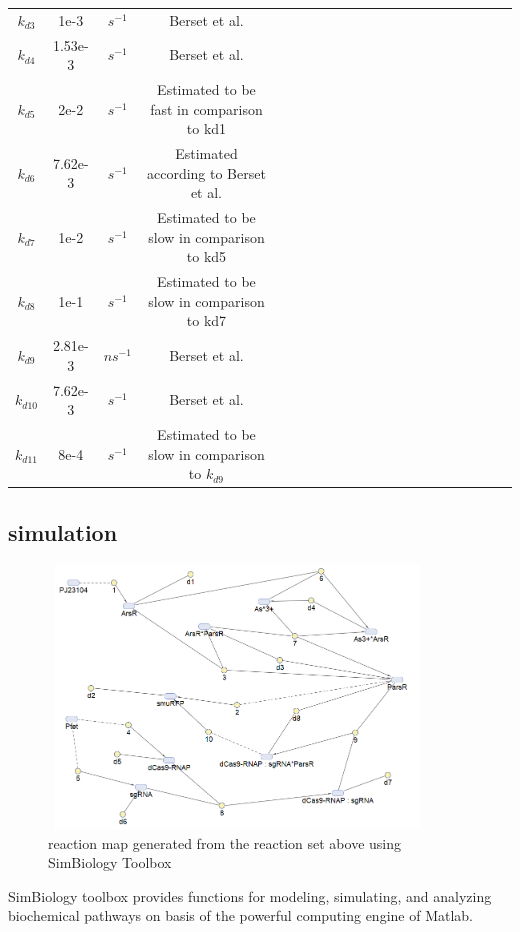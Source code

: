 \begin{table}[htbp]
\begin{tabular}{ccccccccccccccccccccc}
		$k_{d3}$&1e-3&$s^{-1} $ & Berset et al.\\
		$k_{d4}$&1.53e-3&$s^{-1} $  & Berset et al.\\
		$k_{d5} $& 2e-2&$s^{-1} $& Estimated to be fast in comparison to kd1\\
		$k_{d6}$&7.62e-3&$s^{-1} $&  Estimated according to 	
		Berset et al.\\
		$k_{d7}$& 1e-2&$s^{-1} $&  Estimated to be slow in comparison to kd5\\
		$k_{d8}$&1e-1&$s^{-1} $&  Estimated to be slow in comparison to kd7\\
		$k_{d9}$&2.81e-3  & $ns^{-1}$ & Berset et al.  \\
		$k_{d10} $ &7.62e-3 &$s^{-1}$ & Berset et al. \\
		$k_{d11}$& 8e-4& $s^{-1}$& Estimated to be slow in comparison to $k_{d9}$ \\
		\bottomrule
	\end{tabular}
\end{table}



\subsection{simulation }
\begin{figure}[h]
	\centering
	\includegraphics[width=10cm,height=7cm]{screenshot003}	
	\caption{reaction map generated from the reaction set above using SimBiology Toolbox}
\end{figure}
SimBiology toolbox provides functions for modeling, simulating, and analyzing biochemical pathways on basis of the powerful computing engine of Matlab.

